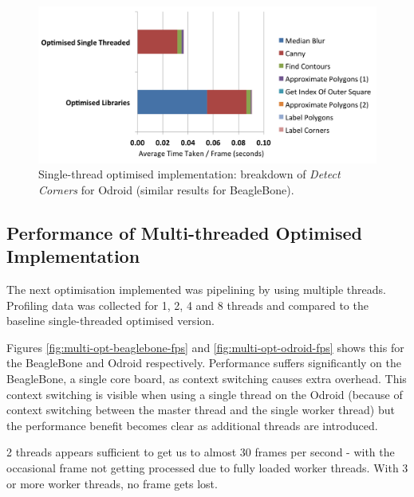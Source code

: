 \documentclass{acm_proc_article-sp}
\begin{document}
\begin{figure}[htbp]
\centering
\includegraphics[width=\textwidth]{images/performance/single-opt-breakdown-detect-corners.png}
\caption{Single-thread optimised implementation: breakdown of \textit{Detect Corners} for Odroid (similar results for BeagleBone).}
\label{fig:single-opt-breakdown-detect-corners}
\end{figure}


\subsection{Performance of Multi-threaded Optimised Implementation}

The next optimisation implemented was pipelining by using multiple threads. Profiling data was collected for 1, 2, 4 and 8 threads and compared to the baseline single-threaded optimised version. 

Figures \ref{fig:multi-opt-beaglebone-fps} and \ref{fig:multi-opt-odroid-fps} shows this for the BeagleBone and Odroid respectively. Performance suffers significantly on the BeagleBone, a single core board, as context switching causes extra overhead. This context switching is visible when using a single thread on the Odroid (because of context switching between the master thread and the single worker thread) but the performance benefit becomes clear as additional threads are introduced.

2 threads appears sufficient to get us to almost 30 frames per second - with the occasional frame not getting processed due to fully loaded worker threads. With 3 or more worker threads, no frame gets lost.
\end{document}
